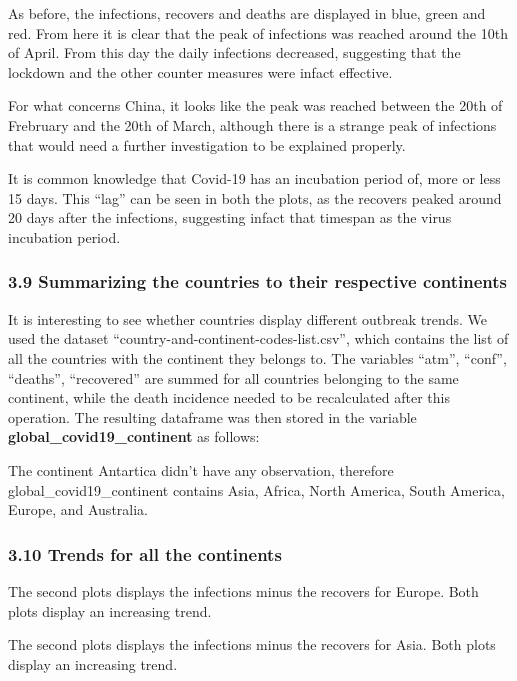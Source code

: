 \documentclass[11pt]{article}
\begin{document}
As before, the infections, recovers and deaths are displayed in blue,
green and red. From here it is clear that the peak of infections was
reached around the 10th of April. From this day the daily infections
decreased, suggesting that the lockdown and the other counter measures
were infact effective.

For what concerns China, it looks like the peak was reached between the
20th of Frebruary and the 20th of March, although there is a strange
peak of infections that would need a further investigation to be
explained properly.

It is common knowledge that Covid-19 has an incubation period of, more
or less 15 days. This ``lag'' can be seen in both the plots, as the
recovers peaked around 20 days after the infections, suggesting infact
that timespan as the virus incubation period.

\hypertarget{summarizing-the-countries-to-their-respective-continents}{%
\subsubsection{3.9 Summarizing the countries to their respective
continents}\label{summarizing-the-countries-to-their-respective-continents}}

It is interesting to see whether countries display different outbreak
trends. We used the dataset ``country-and-continent-codes-list.csv'',
which contains the list of all the countries with the continent they
belongs to. The variables ``atm'', ``conf'', ``deaths'', ``recovered''
are summed for all countries belonging to the same continent, while the
death incidence needed to be recalculated after this operation. The
resulting dataframe was then stored in the variable
\textbf{global\_covid19\_continent} as follows:

The continent Antartica didn't have any observation, therefore
global\_covid19\_continent contains Asia, Africa, North America, South
America, Europe, and Australia.

\hypertarget{trends-for-all-the-continents}{%
\subsubsection{3.10 Trends for all the
continents}\label{trends-for-all-the-continents}}

The second plots displays the infections minus the recovers for Europe.
Both plots display an increasing trend.

The second plots displays the infections minus the recovers for Asia.
Both plots display an increasing trend.
\end{document}
